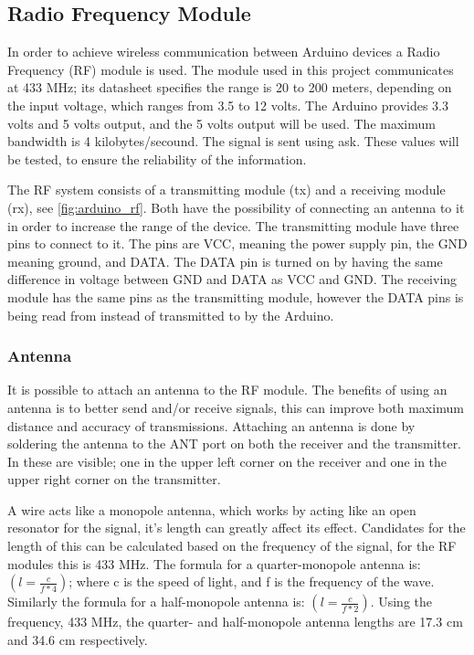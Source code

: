\subsection{Radio Frequency Module} \label{rfmodule}
In order to achieve wireless communication between Arduino devices a Radio Frequency (RF) module is used.
The module used in this project communicates at 433 MHz; its datasheet specifies the range is 20 to 200 meters, depending on the input voltage, which ranges from 3.5 to 12 volts. 
The Arduino provides 3.3 volts and 5 volts output, and the 5 volts output will be used.
The maximum bandwidth is 4 kilobytes/secound. 
The signal is sent using \gls{ask}.
These values will be tested, to ensure the reliability of the information. 

The RF system consists of a transmitting module (tx) and a receiving module (rx), see \ref{fig:arduino_rf}.
Both have the possibility of connecting an antenna to it in order to increase the range of the device.
The transmitting module have three pins to connect to it.
The pins are VCC, meaning the power supply pin, the GND meaning ground, and DATA.
The DATA pin is turned on by having the same difference in voltage between GND and DATA as VCC and GND. 
The receiving module has the same pins as the transmitting module, however the DATA pins is being read from instead of transmitted to by the Arduino.


\subsubsection{Antenna}
It is possible to attach an antenna to the RF module. 
The benefits of using an antenna is to better send and/or receive signals, this can improve both maximum distance and accuracy of transmissions.
Attaching an antenna is done by soldering the antenna to the ANT port on both the receiver and the transmitter. 
In  these are visible; one in the upper left corner on the receiver and one in the upper right corner on the transmitter. 

A wire acts like a monopole antenna, which works by acting like an open resonator for the signal, it's length can greatly affect its effect. 
Candidates for the length of this can be calculated based on the frequency of the signal, for the RF modules this is 433 MHz.
The formula for a quarter-monopole antenna is: $(l = \frac{c}{f * 4})$; where c is the speed of light, and f is the frequency of the wave.
Similarly the formula for a half-monopole antenna is: $(l = \frac{c}{f * 2})$.
Using the frequency, 433 MHz, the quarter- and half-monopole antenna lengths are 17.3 cm and 34.6 cm respectively.  

